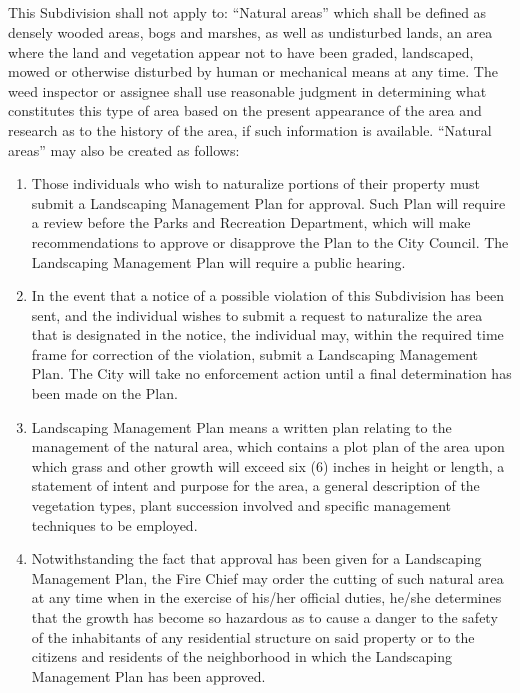 \subsection{}
This Subdivision shall not apply to: “Natural areas” which shall be defined as densely wooded areas, bogs and marshes, as well as undisturbed lands, an area where the land and vegetation appear not to have been graded, landscaped, mowed or otherwise disturbed by human or mechanical means at any time. The weed inspector or assignee shall use reasonable judgment in determining what constitutes this type of area based on the present appearance of the area and research as to the history of the area, if such information is available. “Natural areas” may also be created as follows:
\begin{enumerate}[{\indent}1)]
    \item Those individuals who wish to naturalize portions of their property must submit a Landscaping Management Plan for approval.  Such Plan will require a review before the Parks and Recreation Department, which will make recommendations to approve or disapprove the Plan to the City Council.  The Landscaping Management Plan will require a public hearing.
    \item In the event that a notice of a possible violation of this Subdivision has been sent, and the individual wishes to submit a request to naturalize the area that is designated in the notice, the individual may, within the required time frame for correction of the violation, submit a Landscaping Management Plan.  The City will take no enforcement action until a final determination has been made on the Plan.
    \item Landscaping Management Plan means a written plan relating to the management of the natural area, which contains a plot plan of the area upon which grass and other growth will exceed six (6) inches in height or length, a statement of intent and purpose for the area, a general description of the vegetation types, plant succession involved and specific management techniques to be employed.
    \item Notwithstanding the fact that approval has been given for a Landscaping Management Plan, the Fire Chief may order the cutting of such natural area at any time when in the exercise of his/her official duties, he/she determines that the growth has become so hazardous as to cause a danger to the safety of the inhabitants of any residential structure on said property or to the citizens and residents of the neighborhood in which the Landscaping Management Plan has been approved.
\end{enumerate}
